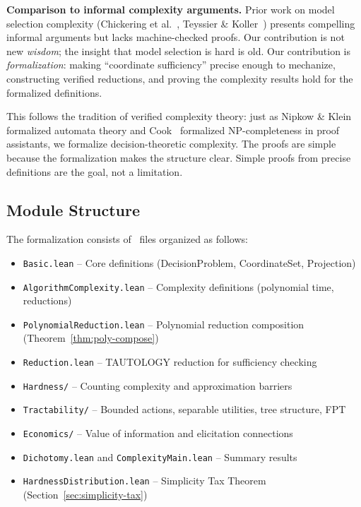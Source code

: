 \textbf{Comparison to informal complexity arguments.} Prior work on model selection complexity (Chickering et al.~\cite{chickering2004large}, Teyssier \& Koller~\cite{teyssier2012ordering}) presents compelling informal arguments but lacks machine-checked proofs. Our contribution is not new \emph{wisdom}; the insight that model selection is hard is old. Our contribution is \emph{formalization}: making ``coordinate sufficiency'' precise enough to mechanize, constructing verified reductions, and proving the complexity results hold for the formalized definitions.

This follows the tradition of verified complexity theory: just as Nipkow \& Klein~\cite{nipkow2014concrete} formalized automata theory and Cook~\cite{cook2018complexity} formalized NP-completeness in proof assistants, we formalize decision-theoretic complexity. The proofs are simple because the formalization makes the structure clear. Simple proofs from precise definitions are the goal, not a limitation.

\subsection{Module Structure}

The formalization consists of \LeanTotalFiles\ files organized as follows:

\begin{itemize}
\item \texttt{Basic.lean} -- Core definitions (DecisionProblem, CoordinateSet, Projection)
\item \texttt{AlgorithmComplexity.lean} -- Complexity definitions (polynomial time, reductions)
\item \texttt{PolynomialReduction.lean} -- Polynomial reduction composition (Theorem~\ref{thm:poly-compose})
\item \texttt{Reduction.lean} -- TAUTOLOGY reduction for sufficiency checking
\item \texttt{Hardness/} -- Counting complexity and approximation barriers
\item \texttt{Tractability/} -- Bounded actions, separable utilities, tree structure, FPT
\item \texttt{Economics/} -- Value of information and elicitation connections
\item \texttt{Dichotomy.lean} and \texttt{ComplexityMain.lean} -- Summary results
\item \texttt{HardnessDistribution.lean} -- Simplicity Tax Theorem (Section~\ref{sec:simplicity-tax})
\end{itemize}

